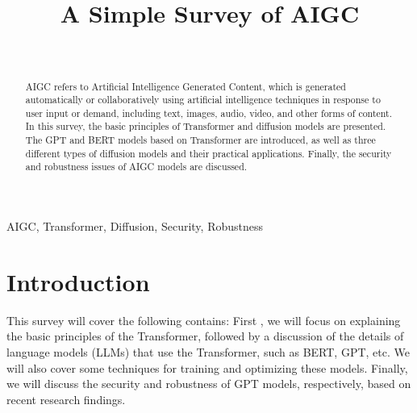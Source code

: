 \documentclass[conference]{IEEEtran}
\begin{document}
\title{A Simple Survey of AIGC\\
}

\author{\\
}

\maketitle

\begin{abstract}
AIGC refers to Artificial Intelligence Generated Content, 
which is generated automatically or collaboratively using 
artificial intelligence techniques in response to user input 
or demand, including text, images, audio, video, and other forms 
of content. In this survey, the basic principles of Transformer 
and diffusion models are presented. The GPT and BERT models 
based on Transformer are introduced, as well as three different 
types of diffusion models and their practical applications. 
Finally, the security and robustness issues of AIGC models are 
discussed.
\end{abstract}

\begin{IEEEkeywords}
AIGC, Transformer, Diffusion, Security, Robustness
\end{IEEEkeywords}

\section{Introduction}
This survey will cover the following contains: First , 
we will focus on explaining the basic principles of the Transformer, 
followed by a discussion of the details of language models (LLMs) 
that use the Transformer, such as BERT, GPT, etc. 
We will also cover some techniques for training and optimizing 
these models. 
Finally, we will discuss the security and 
robustness of GPT models, respectively, 
based on recent research findings.
\end{document}
